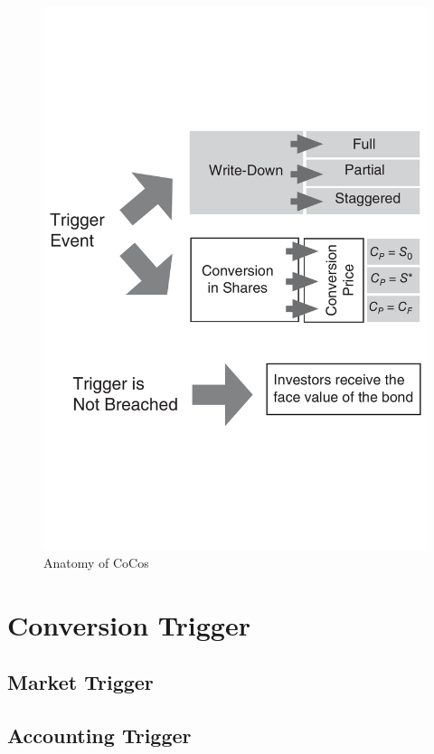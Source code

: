 \begin{figure}[ht]
	\centering
	\includegraphics[trim=0.6cm 7.05cm 0.9cm 7cm, scale = 0.4]{media/anatomy} \par
	\caption[Anatomy of CoCos]{Anatomy of CoCos \citep{de2011handbook}}
\end{figure}

\section{Conversion Trigger}

\subsection{Market Trigger}

\subsection{Accounting Trigger}

